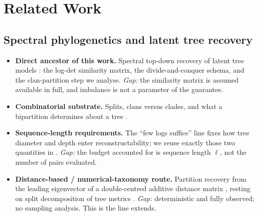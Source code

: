 %
%
%

\section{Related Work}\label{sec:related}

\subsection*{Spectral phylogenetics and latent tree recovery}
\begin{itemize}[leftmargin=1.4em, itemsep=3pt, topsep=2pt]
  \item \textbf{Direct ancestor of this work.} Spectral top-down recovery of
        latent tree models \cite{aizenbud2023spectral}: the log-det similarity
        matrix, the divide-and-conquer schema, and the clan-partition step we
        analyse. \emph{Gap:} the similarity matrix is assumed available in full,
        and imbalance is not a parameter of the guarantee.
  \item \textbf{Combinatorial substrate.} Splits, clans versus clades, and what a
        bipartition determines about a tree
        \cite{semple2003phylogenetics, wilkinson2007clades}.
  \item \textbf{Sequence-length requirements.} The ``few logs suffice'' line
        \cite{erdos1999logs} fixes how tree diameter and depth enter
        reconstructability; we reuse exactly those two quantities in
        . \emph{Gap:} the budget accounted for is sequence
        length $\ell$, not the number of pairs evaluated.
  \item \textbf{Distance-based / numerical-taxonomy route.} Partition recovery
        from the leading eigenvector of a double-centred additive distance matrix
        \cite{Griffing2012}, resting on split decomposition of tree metrics
        \cite{BandeltDress1992}. \emph{Gap:} deterministic and fully observed; no
        sampling analysis. This is the line  extends.
\end{itemize}

